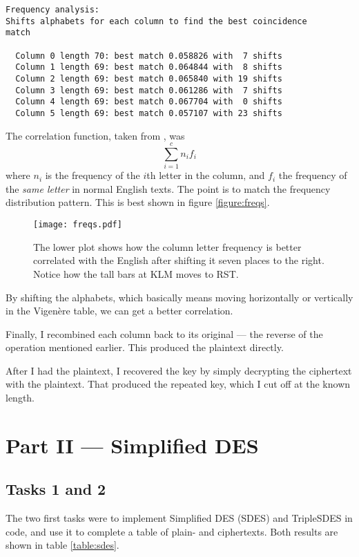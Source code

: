 \documentclass[a4paper,english,12pt]{article}
\begin{document}
\begin{verbatim}
Frequency analysis:
Shifts alphabets for each column to find the best coincidence
match

  Column 0 length 70: best match 0.058826 with  7 shifts
  Column 1 length 69: best match 0.064844 with  8 shifts
  Column 2 length 69: best match 0.065840 with 19 shifts
  Column 3 length 69: best match 0.061286 with  7 shifts
  Column 4 length 69: best match 0.067704 with  0 shifts
  Column 5 length 69: best match 0.057107 with 23 shifts
\end{verbatim}

The correlation function, taken from \cite{wiki:coincidence}, was
\[
  \sum_{i=1}^{c} n_i f_i
\]
where $n_i$ is the frequency of the $i$th letter in the column, and $f_i$ the
frequency of the \textit{same letter} in normal English texts. The point is to
match the frequency distribution pattern. This is best shown in figure
\vref{figure:freqs}.

\begin{figure}
  \centering
  \texttt{[image: freqs.pdf]}
  \caption{The lower plot shows how the column letter frequency is better
  correlated with the English after shifting it seven places to the right.
  Notice how the tall bars at KLM moves to RST.}
  \label{figure:freqs}
\end{figure}

By shifting the alphabets, which basically means moving horizontally or
vertically in the Vigenère table, we can get a better correlation.

Finally, I recombined each column back to its original --- the reverse of the
operation mentioned earlier. This produced the plaintext directly.

After I had the plaintext, I recovered the key by simply decrypting the
ciphertext with the plaintext. That produced the repeated key, which I cut off
at the known length.

\section{Part II --- Simplified DES}

\subsection{Tasks 1 and 2}

The two first tasks were to implement Simplified DES (SDES)
\cite{stallings2006cryptography} and TripleSDES in code, and use it to complete
a table of plain- and ciphertexts. Both results are shown in table
\vref{table:sdes}.
\end{document}
